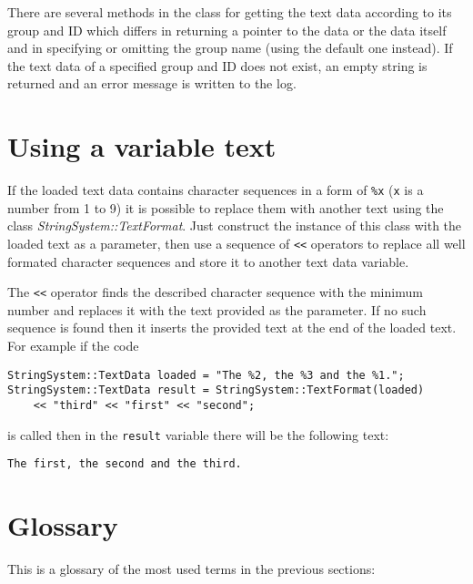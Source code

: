 There are several methods in the class for getting the text data according to its group and ID which differs in returning a pointer to the data or the data itself and in specifying or omitting the group name (using the default one instead). If the text data of a specified group and ID does not exist, an empty string is returned and an error message is written to the log.

\section{Using a variable text}
\label{sec:text-format}

If the loaded text data contains character sequences in a form of \verb/%x/ (\verb/x/ is a number from 1 to 9) it is possible to replace them with another text using the class \emph{StringSystem::TextFormat}. Just construct the instance of this class with the loaded text as a parameter, then use a sequence of \verb/<</ operators to replace all well formated character sequences and store it to another text data variable.

The \verb/<</ operator finds the described character sequence with the minimum number and replaces it with the text provided as the parameter. If no such sequence is found then it inserts the provided text at the end of the loaded text. For example if the code

\begin{verbatim}
StringSystem::TextData loaded = "The %2, the %3 and the %1.";
StringSystem::TextData result = StringSystem::TextFormat(loaded)
    << "third" << "first" << "second";
\end{verbatim}

\noindent is called then in the \verb/result/ variable there will be the following text:

\begin{verbatim}
The first, the second and the third.
\end{verbatim}


\section{Glossary}
This is a glossary of the most used terms in the previous sections:

